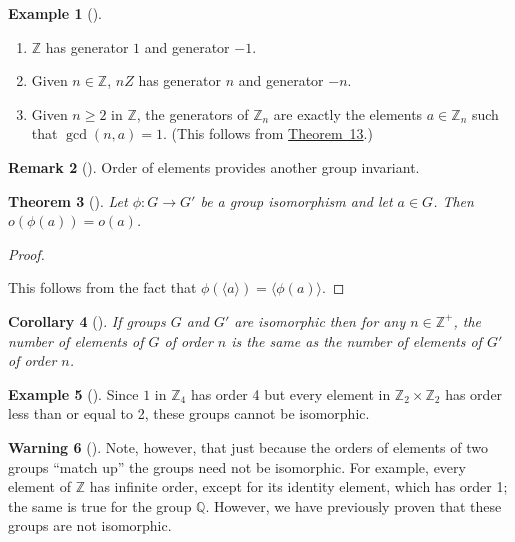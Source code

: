 \documentclass[10pt,]{book}
\theoremstyle{plain}
\newtheorem{theorem}{Theorem}[section]
\newtheorem{corollary}[theorem]{Corollary}
\theoremstyle{definition}
\theoremstyle{definition}
\newtheorem{remark}[theorem]{Remark}
\newtheorem{warning}[theorem]{Warning}
\theoremstyle{definition}
\newtheorem{example}[theorem]{Example}
\theoremstyle{definition}
\numberwithin{equation}{section}
\def\Z{\mathbb{Z}}
\def\Q{\mathbb{Q}}
\begin{document}
\begin{example}[]\label{example-44}
\leavevmode%
\begin{enumerate}
\item\hypertarget{li-263}{}\(\Z\) has generator \(1\) and generator \(-1\).%
\item\hypertarget{li-264}{}Given \(n\in \Z\), \(nZ\) has generator \(n\) and generator \(-n\).%
\item\hypertarget{li-265}{}Given \(n\geq 2\) in \(\Z\), the generators of \(\Z_n\) are exactly  the elements \(a\in \Z_n\) such that \(\gcd(n,a)=1\). (This follows from \hyperref[znorders]{Theorem~13}.)%
\end{enumerate}
\end{example}
\begin{remark}[]\label{remark-23}
Order of elements provides another group invariant.%
\end{remark}
\begin{theorem}[{}]\label{ophia}
Let \(\phi:G\to G'\) be a group isomorphism and let \(a\in G\). Then \(o(\phi(a))=o(a)\).%
\end{theorem}
\begin{proof}\hypertarget{proof-26}{}
This follows from the fact that \(\phi(\langle a\rangle )=\langle \phi(a)\rangle\).%
\end{proof}
\begin{corollary}[{}]\label{corollary-4}
If groups \(G\) and \(G'\) are isomorphic then for any \(n\in \Z^+\), the number of elements of \(G\) of order \(n\) is the same as the number of elements of \(G'\) of order \(n\).%
\end{corollary}
\begin{example}[]\label{example-45}
Since \(1\) in \(\Z_4\) has order 4 but every element in \(\Z_2 \times \Z_2\) has order less than or equal to 2, these groups cannot be isomorphic.%
\end{example}
\begin{warning}[]\label{warning-15}
Note, however, that just because the orders of elements of two groups ``match up'' the groups need not be isomorphic. For example, every element of \(\Z\) has infinite order, except for its identity element, which has order 1; the same is true for the group \(\Q\). However, we have previously proven that these groups are not isomorphic.%
\end{warning}
\typeout{************************************************}
\typeout{************************************************}
\end{document}
